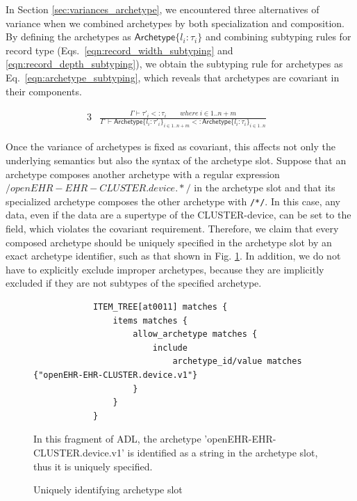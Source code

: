 \documentclass[preprint,3p,onecolumn,times,review]{elsarticle}
\begin{document}
In Section \ref{sec:variances_archetype}, we encountered three alternatives of variance when we combined archetypes by both specialization and composition.
By defining the archetypes as $\mathsf{Archetype}\{l_i : \tau_i \}$ and combining subtyping rules for record type (Eqs.~\ref{eqn:record_width_subtyping} and \ref{eqn:record_depth_subtyping}), we obtain the subtyping rule for archetypes as Eq.~\ref{eqn:archetype_subtyping}, which reveals that archetypes are covariant in their components.

  \begin{alignat}{3}
    & \frac{\Gamma \vdash \tau'_i <: \tau_i \qquad where~i \in 1..n+m}
           {\Gamma ~ \vdash \mathsf{Archetype}\{l_i: \tau'_i \}_{i \in 1..n+m}  <: \mathsf{Archetype}\{l_i: \tau_i\}_{i \in 1..n}}   & \label{eqn:archetype_subtyping}
  \end{alignat}

Once the variance of archetypes is fixed as covariant, this affects not only the underlying semantics but also the syntax of the archetype slot. Suppose that an archetype composes another archetype with a regular expression $/openEHR-EHR-CLUSTER.device.*/$ in the archetype slot and that its specialized archetype composes the other archetype with \verb|/*/|. In this case, any data, even if the data are a supertype of the CLUSTER-device, can be set to the field, which violates the covariant requirement. Therefore, we claim that every composed archetype should be uniquely specified in the archetype slot by an exact archetype identifier, such as that shown in Fig. \ref{fig:archetype_slot_in_string}. In addition, we do not have to explicitly exclude improper archetypes, because they are implicitly excluded if they are not subtypes of the specified archetype.

\begin{figure}[!htbp]
\begin{verbatim}
            ITEM_TREE[at0011] matches {
                items matches {
                    allow_archetype matches {
                        include
                            archetype_id/value matches {"openEHR-EHR-CLUSTER.device.v1"}
                    }
                }
            }
\end{verbatim}\caption{Uniquely identifying archetype slot}\label{fig:archetype_slot_in_string}
In this fragment of ADL, the archetype 'openEHR-EHR-CLUSTER.device.v1' is identified as a string in the archetype slot, thus it is uniquely specified.
\end{figure}
\end{document}
